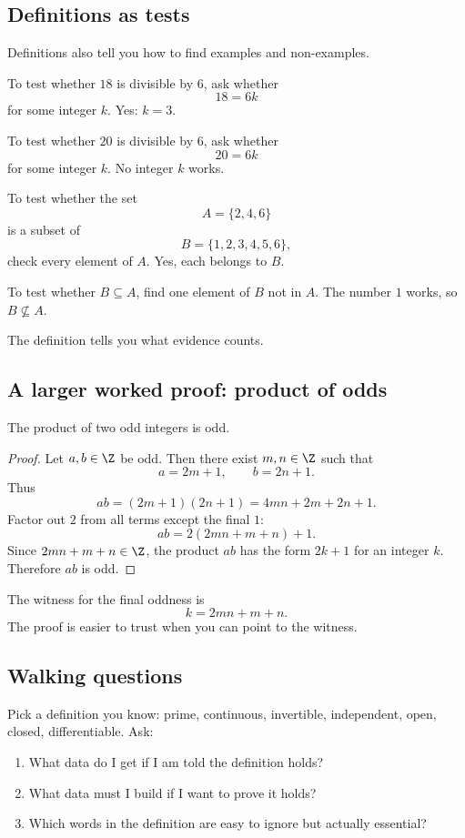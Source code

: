 \subsection{Definitions as tests}

Definitions also tell you how to find examples and non-examples.

To test whether $18$ is divisible by $6$, ask whether
\[
18=6k
\]
for some integer $k$. Yes: $k=3$.

To test whether $20$ is divisible by $6$, ask whether
\[
20=6k
\]
for some integer $k$. No integer $k$ works.

To test whether the set
\[
A=\{2,4,6\}
\]
is a subset of
\[
B=\{1,2,3,4,5,6\},
\]
check every element of $A$. Yes, each belongs to $B$.

To test whether $B\subseteq A$, find one element of $B$ not in $A$. The number $1$ works, so $B\not\subseteq A$.

The definition tells you what evidence counts.

\subsection{A larger worked proof: product of odds}

\begin{theorem}
The product of two odd integers is odd.
\end{theorem}

\begin{proof}
Let $a,b\in\Z$ be odd. Then there exist $m,n\in\Z$ such that
\[
a=2m+1,\qquad b=2n+1.
\]
Thus
\[
ab=(2m+1)(2n+1)=4mn+2m+2n+1.
\]
Factor out $2$ from all terms except the final $1$:
\[
ab=2(2mn+m+n)+1.
\]
Since $2mn+m+n\in\Z$, the product $ab$ has the form $2k+1$ for an integer $k$. Therefore $ab$ is odd.
\end{proof}

The witness for the final oddness is
\[
k=2mn+m+n.
\]
The proof is easier to trust when you can point to the witness.

\subsection{Walking questions}

\begin{walkbox}
Pick a definition you know: prime, continuous, invertible, independent, open, closed, differentiable. Ask:

\begin{enumerate}
\item What data do I get if I am told the definition holds?
\item What data must I build if I want to prove it holds?
\item Which words in the definition are easy to ignore but actually essential?
\end{enumerate}
\end{walkbox}

